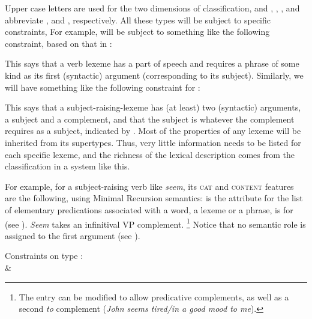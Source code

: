 \documentclass[output=paper
	        ,collection
	        ,collectionchapter
 	        ,biblatex
                ,babelshorthands
                ,newtxmath
                ,draftmode
                ,colorlinks, citecolor=brown
]{langscibook}
\begin{document}
Upper case letters are used for the two dimensions of classification, and , , , and  abbreviate , and , respectively. All these types will be subject to specific constraints, For example,  will be subject to something like the following constraint, based on that in \citet[22]{GSag2000a-u}:

\ea\label{ex:prop21}
 \impl
{}
\z

\noindent
This says that a verb lexeme has a  part of speech and requires a phrase of some kind as its first (syntactic) argument (corresponding to its subject). Similarly, we will have something like the following constraint for :

\ea\label{ex:prop22}
 \impl
{}
\z

\noindent
This says that a subject-raising-lexeme has (at least) two (syntactic) arguments, a subject and a complement, and that the subject is whatever the complement requires as a subject, indicated by . Most of the properties of any lexeme will be inherited from its supertypes. Thus, very little information needs to be listed for each specific lexeme, and the richness of the lexical description comes from the classification in a system like this.

For example, for a subject-raising verb like \emph{seem}, its \textsc{cat} and \textsc{content}
features are the following, using Minimal Recursion semantics\indexmrs:  is the
attribute for the list of elementary predications associated with a word, a lexeme or a phrase,
 is for  (see ). \emph{Seem} takes an infinitival VP complement.%
%
\footnote{The entry can be modified to allow predicative complements, as well as a second \emph{to} complement (\emph{John seems tired/in a good mood to me}).}
%
Notice that no semantic role is assigned to the first argument (see ).

\ea\label{ex:prop23}
Constraints on type :\\
 \impl {} \&\\
\z
\end{document}
